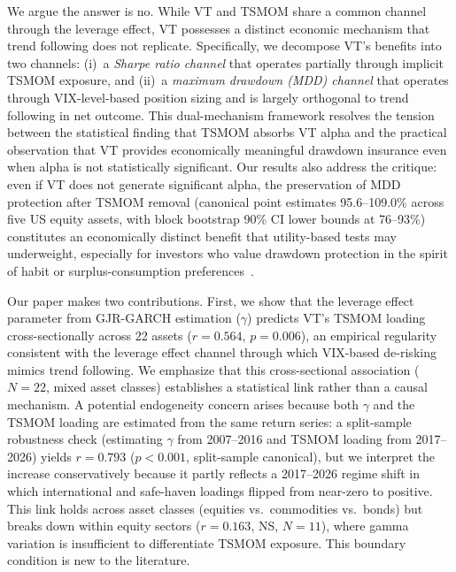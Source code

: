 We argue the answer is no. While VT and TSMOM share a common channel through the leverage effect, VT possesses a distinct economic mechanism that trend following does not replicate. Specifically, we decompose VT's benefits into two channels: (i)~a \textit{Sharpe ratio channel} that operates partially through implicit TSMOM exposure, and (ii)~a \textit{maximum drawdown (MDD) channel} that operates through VIX-level-based position sizing and is largely orthogonal to trend following in net outcome. This dual-mechanism framework resolves the tension between the statistical finding that TSMOM absorbs VT alpha and the practical observation that VT provides economically meaningful drawdown insurance even when alpha is not statistically significant. Our results also address the \citet{cederburg2020} critique: even if VT does not generate significant alpha, the preservation of MDD protection after TSMOM removal (canonical point estimates 95.6--109.0\% across five US equity assets, with block bootstrap 90\% CI lower bounds at 76--93\%) constitutes an economically distinct benefit that utility-based tests may underweight, especially for investors who value drawdown protection in the spirit of habit or surplus-consumption preferences~\citep{campbell1999}.

Our paper makes two contributions. First, we show that the leverage effect parameter from GJR-GARCH estimation ($\gamma$) predicts VT's TSMOM loading cross-sectionally across 22 assets ($r = 0.564$, $p = 0.006$), an empirical regularity consistent with the leverage effect channel through which VIX-based de-risking mimics trend following. We emphasize that this cross-sectional association ($N = 22$, mixed asset classes) establishes a statistical link rather than a causal mechanism. A potential endogeneity concern arises because both $\gamma$ and the TSMOM loading are estimated from the same return series: a split-sample robustness check (estimating $\gamma$ from 2007--2016 and TSMOM loading from 2017--2026) yields $r = 0.793$ ($p < 0.001$, split-sample canonical), but we interpret the increase conservatively because it partly reflects a 2017--2026 regime shift in which international and safe-haven loadings flipped from near-zero to positive. This link holds across asset classes (equities vs.\ commodities vs.\ bonds) but breaks down within equity sectors ($r = 0.163$, NS, $N = 11$), where gamma variation is insufficient to differentiate TSMOM exposure. This boundary condition is new to the literature.

